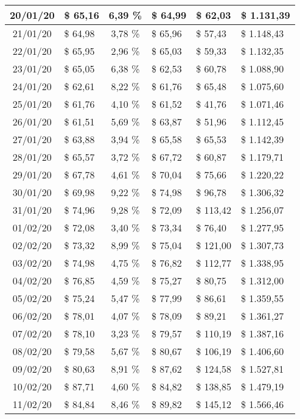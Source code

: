\begin{center}
\begin{small}
\begin{longtable}{|c|l|c|l|l|l|}
20/01/20 & \$ 65,16 & 6,39 \% & \$ 64,99 & \$ 62,03 & \$ 1.131,39 \\ \hline
21/01/20 & \$ 64,98 & 3,78 \% & \$ 65,96 & \$ 57,43 & \$ 1.148,43 \\ \hline
22/01/20 & \$ 65,95 & 2,96 \% & \$ 65,03 & \$ 59,33 & \$ 1.132,35 \\ \hline
23/01/20 & \$ 65,05 & 6,38 \% & \$ 62,53 & \$ 60,78 & \$ 1.088,90 \\ \hline
24/01/20 & \$ 62,61 & 8,22 \% & \$ 61,76 & \$ 65,48 & \$ 1.075,60 \\ \hline
25/01/20 & \$ 61,76 & 4,10 \% & \$ 61,52 & \$ 41,76 & \$ 1.071,46 \\ \hline
26/01/20 & \$ 61,51 & 5,69 \% & \$ 63,87 & \$ 51,96 & \$ 1.112,45 \\ \hline
27/01/20 & \$ 63,88 & 3,94 \% & \$ 65,58 & \$ 65,53 & \$ 1.142,39 \\ \hline
28/01/20 & \$ 65,57 & 3,72 \% & \$ 67,72 & \$ 60,87 & \$ 1.179,71 \\ \hline
29/01/20 & \$ 67,78 & 4,61 \% & \$ 70,04 & \$ 75,66 & \$ 1.220,22 \\ \hline
30/01/20 & \$ 69,98 & 9,22 \% & \$ 74,98 & \$ 96,78 & \$ 1.306,32 \\ \hline
31/01/20 & \$ 74,96 & 9,28 \% & \$ 72,09 & \$ 113,42 & \$ 1.256,07 \\ \hline
01/02/20 & \$ 72,08 & 3,40 \% & \$ 73,34 & \$ 76,40 & \$ 1.277,95 \\ \hline
02/02/20 & \$ 73,32 & 8,99 \% & \$ 75,04 & \$ 121,00 & \$ 1.307,73 \\ \hline
03/02/20 & \$ 74,98 & 4,75 \% & \$ 76,82 & \$ 112,77 & \$ 1.338,95 \\ \hline
04/02/20 & \$ 76,85 & 4,59 \% & \$ 75,27 & \$ 80,75 & \$ 1.312,00 \\ \hline
05/02/20 & \$ 75,24 & 5,47 \% & \$ 77,99 & \$ 86,61 & \$ 1.359,55 \\ \hline
06/02/20 & \$ 78,01 & 4,07 \% & \$ 78,09 & \$ 89,21 & \$ 1.361,27 \\ \hline
07/02/20 & \$ 78,10 & 3,23 \% & \$ 79,57 & \$ 110,19 & \$ 1.387,16 \\ \hline
08/02/20 & \$ 79,58 & 5,67 \% & \$ 80,67 & \$ 106,19 & \$ 1.406,60 \\ \hline
09/02/20 & \$ 80,63 & 8,91 \% & \$ 87,62 & \$ 124,58 & \$ 1.527,81 \\ \hline
10/02/20 & \$ 87,71 & 4,60 \% & \$ 84,82 & \$ 138,85 & \$ 1.479,19 \\ \hline
11/02/20 & \$ 84,84 & 8,46 \% & \$ 89,82 & \$ 145,12 & \$ 1.566,46 \\ \hline

\end{longtable}
\end{small}
\end{center}
